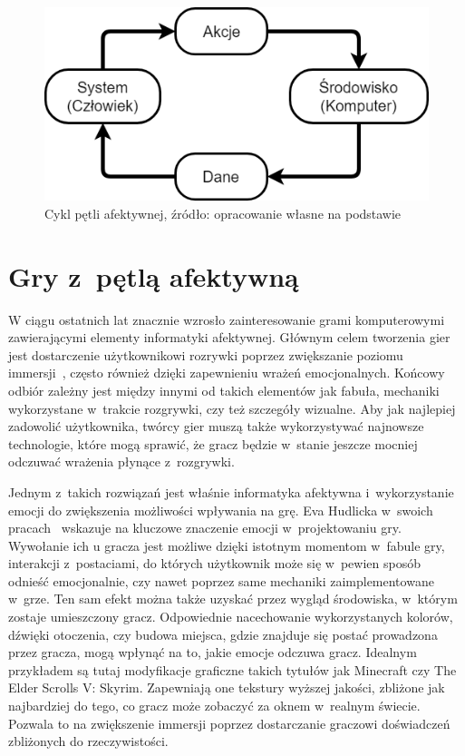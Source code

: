\begin{figure}
	\centering
	\includegraphics[width=0.6\linewidth]{images/affective_loop.png}
	\caption{Cykl pętli afektywnej, źródło: opracowanie własne na podstawie~\cite{affective_loop_experiences}}
	\label{fig:affective_loop}
\end{figure}

\section{Gry z~pętlą afektywną}
W ciągu ostatnich lat znacznie wzrosło zainteresowanie grami komputerowymi zawierającymi elementy informatyki afektywnej. Głównym celem tworzenia gier jest dostarczenie użytkownikowi rozrywki poprzez zwiększanie poziomu immersji~\cite{jennet_immersion_in_games_2008}, często również dzięki zapewnieniu wrażeń emocjonalnych. Końcowy odbiór zależny jest między innymi od takich elementów jak fabuła, mechaniki wykorzystane w~trakcie rozgrywki, czy też szczegóły wizualne. Aby jak najlepiej zadowolić użytkownika, twórcy gier muszą także wykorzystywać najnowsze technologie, które mogą sprawić, że gracz będzie w~stanie jeszcze mocniej odczuwać wrażenia płynące z~rozgrywki. 

Jednym z~takich rozwiązań jest właśnie informatyka afektywna i~wykorzystanie emocji do zwiększenia możliwości wpływania na grę. Eva Hudlicka w~swoich pracach~\cite{hudlicka_2008} wskazuje na kluczowe znaczenie emocji w~projektowaniu gry. Wywołanie ich u gracza jest możliwe dzięki istotnym momentom w~fabule gry, interakcji z~postaciami, do których użytkownik może się w~pewien sposób odnieść emocjonalnie, czy nawet poprzez same mechaniki zaimplementowane w~grze. Ten sam efekt można także uzyskać przez wygląd środowiska, w~którym zostaje umieszczony gracz. Odpowiednie nacechowanie wykorzystanych kolorów, dźwięki otoczenia, czy budowa miejsca, gdzie znajduje się postać prowadzona przez gracza, mogą wpłynąć na to, jakie emocje odczuwa gracz. Idealnym przykładem są tutaj modyfikacje graficzne takich tytułów jak Minecraft czy The Elder Scrolls V: Skyrim. Zapewniają one tekstury wyższej jakości, zbliżone jak najbardziej do tego, co gracz może zobaczyć za oknem w~realnym świecie. Pozwala to na zwiększenie immersji poprzez dostarczanie graczowi doświadczeń zbliżonych do rzeczywistości.

